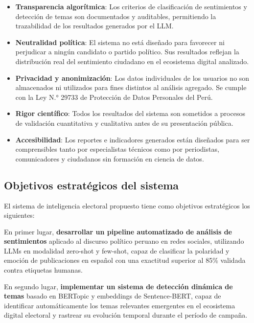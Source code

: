 \documentclass[listof=nochaptergap,12pt,times,authoryear]{report}
\begin{document}
\begin{itemize}
    \item \textbf{Transparencia algorítmica}: Los criterios de clasificación de sentimientos y
    detección de temas son documentados y auditables, permitiendo la trazabilidad de los
    resultados generados por el LLM.
 
    \item \textbf{Neutralidad política}: El sistema no está diseñado para favorecer ni
    perjudicar a ningún candidato o partido político. Sus resultados reflejan la distribución
    real del sentimiento ciudadano en el ecosistema digital analizado.
 
    \item \textbf{Privacidad y anonimización}: Los datos individuales de los usuarios no son
    almacenados ni utilizados para fines distintos al análisis agregado. Se cumple con la
    Ley N.° 29733 de Protección de Datos Personales del Perú.
 
    \item \textbf{Rigor científico}: Todos los resultados del sistema son sometidos a
    procesos de validación cuantitativa y cualitativa antes de su presentación pública.
 
    \item \textbf{Accesibilidad}: Los reportes e indicadores generados están diseñados para
    ser comprensibles tanto por especialistas técnicos como por periodistas, comunicadores
    y ciudadanos sin formación en ciencia de datos.
\end{itemize}
 
\subsection{Objetivos estratégicos del sistema}
 
El sistema de inteligencia electoral propuesto tiene como objetivos estratégicos los
siguientes:
 
En primer lugar, \textbf{desarrollar un pipeline automatizado de análisis de sentimientos}
aplicado al discurso político peruano en redes sociales, utilizando LLMs en modalidad
zero-shot y few-shot, capaz de clasificar la polaridad y emoción de publicaciones en
español con una exactitud superior al 85\% validada contra etiquetas humanas.
 
En segundo lugar, \textbf{implementar un sistema de detección dinámica de temas} basado
en BERTopic y embeddings de Sentence-BERT, capaz de identificar automáticamente los
temas relevantes emergentes en el ecosistema digital electoral y rastrear su evolución
temporal durante el período de campaña.
 
\end{document}
